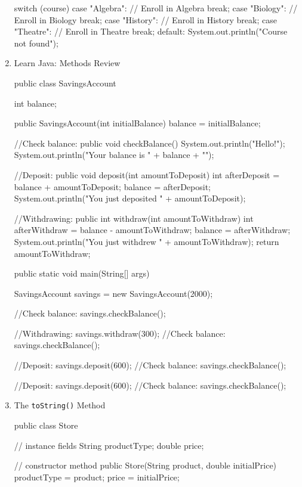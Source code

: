 \documentclass[a4paper,12pt]{article}
\begin{document}
\begin{enumerate}
\begin{javacode}
switch (course) {
  case "Algebra": 
    // Enroll in Algebra
    break; 
  case "Biology": 
    // Enroll in Biology
    break;
  case "History": 
    // Enroll in History
    break;
  case "Theatre":
    // Enroll in Theatre
    break;
  default:
    System.out.println("Course not found");
}
\end{javacode}

\item Learn Java: Methods Review
\begin{javacode}
public class SavingsAccount {

  int balance;

  public SavingsAccount(int initialBalance) {
    balance = initialBalance;
  }

  //Check balance:
  public void checkBalance() {
    System.out.println("Hello!");
    System.out.println("Your balance is " + balance + "\n");
  }

  //Deposit:
  public void deposit(int amountToDeposit) {
    int afterDeposit = balance + amountToDeposit;
    balance = afterDeposit;
    System.out.println("You just deposited " + amountToDeposit);
  }

  //Withdrawing:
  public int withdraw(int amountToWithdraw) {
    int afterWithdraw = balance - amountToWithdraw;
    balance = afterWithdraw;
    System.out.println("You just withdrew " + amountToWithdraw);
    return amountToWithdraw;
  }

  public static void main(String[] args) {
    SavingsAccount savings = new SavingsAccount(2000);

    //Check balance:
    savings.checkBalance();

    //Withdrawing:
    savings.withdraw(300);
    //Check balance:
    savings.checkBalance();

    //Deposit:
    savings.deposit(600);
    //Check balance:
    savings.checkBalance();

    //Deposit:
    savings.deposit(600);
    //Check balance:
    savings.checkBalance();
  }
}
\end{javacode}

\item The \verb|toString()| Method
\begin{javacode}
public class Store {
  // instance fields
  String productType;
  double price;
  
  // constructor method
  public Store(String product, double initialPrice) {
    productType = product;
    price = initialPrice;
  }

}
\end{javacode}
\end{enumerate}
\end{document}

